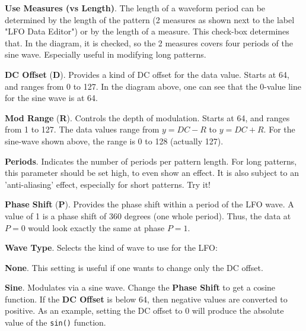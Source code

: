   \begin{enumber}
      \item \textbf{Use Measures (vs Length)}.
         The length of a waveform period can be determined by the length of the
         pattern (2 measures as shown next to the label "LFO Data Editor") or
         by the length of a measure. This check-box determines that.
         In the diagram, it is checked, so the 2 measures covers four periods
         of the sine wave.
         Especially useful in modifying long patterns.
      \item \textbf{DC Offset} (\textbf{D}).
         Provides a kind of DC offset for the data value. Starts at 64, and
         ranges from 0 to 127.
         In the diagram above, one can see that the 0-value line for the sine
         wave is at 64.
      \item \textbf{Mod Range} (\textbf{R}).
         Controls the depth of modulation. Starts at 64, and ranges from 1 to
         127.
         The data values range from \( y = DC - R \) to \( y = DC + R\).
         For the sine-wave shown above, the range is 0 to 128 (actually 127).
      \item \textbf{Periods}.
         Indicates the number of periods per pattern length.
         For long patterns, this parameter should be set high,
         to even show an effect.  It is also subject to an 'anti-aliasing'
         effect, especially for short patterns.
         Try it!
      \item \textbf{Phase Shift} (\textbf{P}).
         Provides the phase shift within a period of the LFO wave.
         A value of 1 is a phase shift of 360 degrees (one whole period).
         Thus, the data at \( P = 0 \) would look exactly the same at phase
         \( P = 1\).
      \item \textbf{Wave Type}.
         Selects the kind of wave to use for the LFO:
         \begin{enumber}
            \item \textbf{None}.
               This setting is useful if one wants to change only the DC
               offset.
            \item \textbf{Sine}.
               Modulates via a sine wave.
               Change the \textbf{Phase Shift} to get a cosine function.
               If the \textbf{DC Offset} is below 64, then negative values are
               converted to positive. As an example, setting the DC offset to 0
               will produce the absolute value of the \texttt{sin()} function.

\end{enumber}
\end{enumber}
